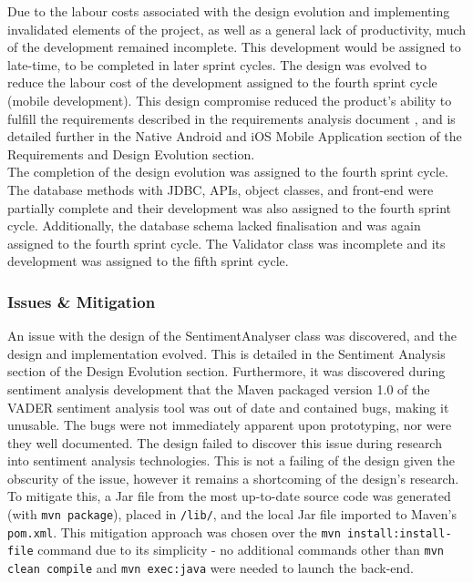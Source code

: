 \documentclass[9pt, titlepage]{extarticle}
\begin{document}
Due to the labour costs associated with the design evolution and implementing invalidated elements of the project, as well as a general lack of productivity, much of the development remained incomplete. This development would be assigned to late-time, to be completed in later sprint cycles. The design was evolved to reduce the labour cost of the development assigned to the fourth sprint cycle (mobile development). This design compromise reduced the product's ability to fulfill the requirements described in the requirements analysis document \cite{requirements-analysis}, and is detailed further in the Native Android and iOS Mobile Application section of the Requirements and Design Evolution section.\\

The completion of the design evolution was assigned to the fourth sprint cycle. The database methods with JDBC, APIs, object classes, and front-end were partially complete and their development was also assigned to the fourth sprint cycle. Additionally, the database schema lacked finalisation and was again assigned to the fourth sprint cycle. The Validator class was incomplete and its development was assigned to the fifth sprint cycle.

\subsubsection{Issues \& Mitigation}

An issue with the design of the SentimentAnalyser class was discovered, and the design and implementation evolved. This is detailed in the Sentiment Analysis section of the Design Evolution section. Furthermore, it was discovered during sentiment analysis development that the Maven packaged version 1.0 of the VADER sentiment analysis tool was out of date and contained bugs, making it unusable. The bugs were not immediately apparent upon prototyping, nor were they well documented. The design failed to discover this issue during research into sentiment analysis technologies. This is not a failing of the design given the obscurity of the issue, however it remains a shortcoming of the design's research.\\

To mitigate this, a Jar file from the most up-to-date source code was generated (with \texttt{mvn package}), placed in \texttt{/lib/}, and the local Jar file imported to Maven's \texttt{pom.xml}. This mitigation approach was chosen over the \texttt{mvn install:install-file} command due to its simplicity - no additional commands other than \texttt{mvn clean compile} and \texttt{mvn exec:java} were needed to launch the back-end.\\
\end{document}
